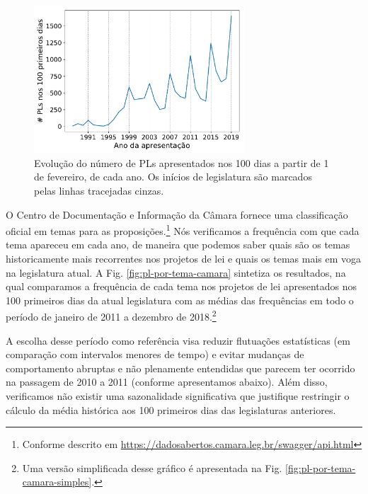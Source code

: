\documentclass[12pt,a4paper]{article}
\newcommand{\footurl}[1]{{\scriptsize\url{#1}}}
\begin{document}
\begin{figure}[H]
  \centering
\includegraphics[width=0.7\textwidth]{graficos/PLs-por-ano_2019-05-03.pdf}
\caption{Evolução do número de PLs apresentados nos 100 dias a partir de 1 de fevereiro, de cada ano.
Os inícios de legislatura são marcados pelas linhas tracejadas cinzas.}
\label{fig:prop-por-ano}
\end{figure}

O Centro de Documentação e Informação da Câmara fornece uma classificação oficial em temas para as
proposições.\footnote{Conforme descrito em \footurl{https://dadosabertos.camara.leg.br/swagger/api.html}}
Nós verificamos a frequência com que cada tema apareceu em cada ano, de maneira que podemos saber
quais são os temas historicamente mais recorrentes nos projetos de lei e quais os temas mais em voga
na legislatura atual. A Fig. \ref{fig:pl-por-tema-camara} sintetiza os resultados, na qual comparamos
a frequência de cada tema nos projetos de lei apresentados nos 100 primeiros dias da atual legislatura com as médias das frequências
em todo o período de janeiro de 2011 a dezembro de
2018.\footnote{Uma versão simplificada desse gráfico é apresentada na Fig. \ref{fig:pl-por-tema-camara-simples}.}

A escolha desse período como referência
visa reduzir flutuações estatísticas (em comparação com intervalos menores de tempo) e evitar mudanças 
de comportamento abruptas e não plenamente entendidas que parecem ter ocorrido na passagem de 2010 a 2011
(conforme apresentamos abaixo). Além disso, verificamos não existir uma sazonalidade significativa
que justifique restringir o cálculo da média histórica aos 100 primeiros dias das legislaturas anteriores.
\end{document}
